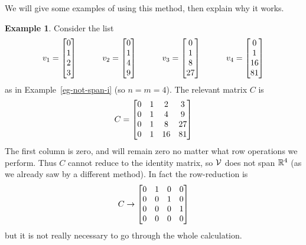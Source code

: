 \documentclass[reqno]{amsart}
\theoremstyle{definition}
\newtheorem{example}[theorem]{Example}
\begin{document}
We will give some examples of using this method, then explain why it
works.
\begin{example}\label{eg-not-span-i-matrix}
 Consider the list
 \[ v_1 = \left[\begin{matrix} 0 \\ 1 \\  2 \\  3 \end{matrix}\right] \hspace{3em}
    v_2 = \left[\begin{matrix} 0 \\ 1 \\  4 \\  9 \end{matrix}\right] \hspace{3em}
    v_3 = \left[\begin{matrix} 0 \\ 1 \\  8 \\ 27 \end{matrix}\right] \hspace{3em}
    v_4 = \left[\begin{matrix} 0 \\ 1 \\ 16 \\ 81 \end{matrix}\right]
 \]
 as in Example~\ref{eg-not-span-i} (so $n=m=4$).  The relevant matrix
 $C$ is
 \[ C   = \left[\begin{matrix}
           0 & 1 &  2 &  3 \\
           0 & 1 &  4 &  9 \\
           0 & 1 &  8 & 27 \\
           0 & 1 & 16 & 81
          \end{matrix}\right]
 \]
 The first column is zero, and will remain zero no matter what row
 operations we perform.  Thus $C$ cannot reduce to the identity
 matrix, so $\mathcal{V}$ does not span ${\mathbb{R}}^4$ (as we already saw by a different
 method).  In fact the row-reduction is
 \[ C \to \left[\begin{matrix} 0 & 1 & 0 & 0 \\
               0 & 0 & 1 & 0 \\
               0 & 0 & 0 & 1 \\
               0 & 0 & 0 & 0 \end{matrix}\right]
 \]
 but it is not really necessary to go through the whole calculation.
\end{example}
\end{document}

